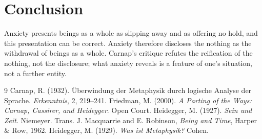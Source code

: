 \documentclass{situationist-preprint}
\begin{document}
\section{Conclusion}

Anxiety presents beings as a whole as slipping away and as offering no hold, and this presentation can be correct. Anxiety therefore discloses the nothing as the withdrawal of beings as a whole. Carnap's critique refutes the reification of the nothing, not the disclosure; what anxiety reveals is a feature of one's situation, not a further entity.

\begin{thebibliography}{9}\small
{} Carnap, R. (1932). \"Uberwindung der Metaphysik durch logische Analyse der Sprache. \emph{Erkenntnis}, 2, 219--241.
 Friedman, M. (2000). \emph{A Parting of the Ways: Carnap, Cassirer, and Heidegger}. Open Court.
 Heidegger, M. (1927). \emph{Sein und Zeit}. Niemeyer. Trans. J. Macquarrie and E. Robinson, \emph{Being and Time}, Harper \& Row, 1962.
 Heidegger, M. (1929). \emph{Was ist Metaphysik?} Cohen.
\end{thebibliography}
\end{document}
